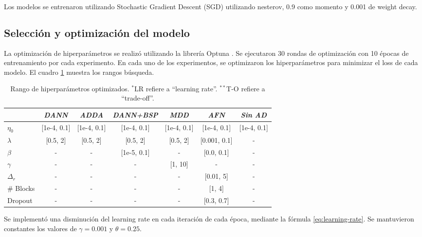 Los modelos se entrenaron utilizando Stochastic Gradient Descent (SGD) \parencite{sutskever2013importance} utilizando nesterov, 0.9 como momento y 0.001 de weight decay.

\subsection{Selección y optimización del modelo}

La optimización de hiperparámetros se realizó utilizando la librería Optuna \parencite{optuna_2019}. Se ejecutaron 30 rondas de optimización con 10 épocas de entrenamiento por cada experimento. En
cada uno de los experimentos, se optimizaron los hiperparámetros para minimizar el loss de cada modelo. El cuadro
\ref{tab:rangos-hiperparametros} muestra los rangos búsqueda.

\begin{table}[H]
    \centering
    \begin{tabular}{l|cccccc}
        \toprule
                   & {\it DANN}  & {\it ADDA}  & {\it DANN+BSP} & {\it MDD}   & {\it AFN}    & {\it Sin AD} \\
        \midrule
        $\eta_0$   & [1e-4, 0.1] & [1e-4, 0.1] & [1e-4, 0.1]    & [1e-4, 0.1] & [1e-4, 0.1]  & [1e-4, 0.1]  \\
        $\lambda$  & [0.5, 2]    & [0.5, 2]    & [0.5, 2]       & [0.5, 2]    & [0.001, 0.1] & -            \\
        $\beta$    & -           & -           & [1e-5, 0.1]    & -           & [0.0, 0.1]   & -            \\
        $\gamma$   & -           & -           & -              & [1, 10]     & -            & -            \\
        $\Delta_r$ & -           & -           & -              & -           & [0.01, 5]    & -            \\
        \# Blocks  & -           & -           & -              & -           & [1, 4]       & -            \\
        Dropout    & -           & -           & -              & -           & [0.3, 0.7]   & -            \\
        \bottomrule
    \end{tabular}
    \caption{Rango de hiperparámetros optimizados. $^{*}$LR refiere a ``learning rate''. $^{**}$T-O refiere a ``trade-off''.}
    \label{tab:rangos-hiperparametros}
\end{table}

Se implementó una disminución del learning rate en cada iteración de cada época, mediante la fórmula
\ref{eq:learning-rate}. Se mantuvieron constantes los valores de $\gamma=0.001$ y $\theta = 0.25$.

